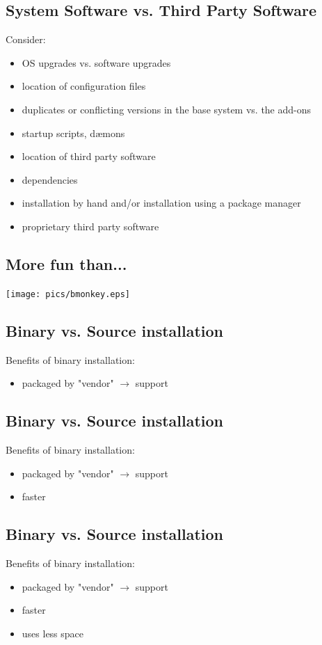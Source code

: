 \documentclass[xga]{xdvislides}
\begin{document}
\subsection{System Software vs. Third Party Software}
Consider:
\begin{itemize}
	\item OS upgrades vs. software upgrades
	\item location of configuration files
	\item duplicates or conflicting versions in the base system vs. the
		add-ons
	\item startup scripts, d{\ae}mons
	\item location of third party software
	\item dependencies
	\item installation by hand and/or installation using a package manager
	\item proprietary third party software
\end{itemize}

\subsection{More fun than...}
\vspace*{\fill}
\begin{center}
	\texttt{[image: pics/bmonkey.eps]}
\end{center}

\subsection{Binary vs. Source installation}
Benefits of binary installation:
\begin{itemize}
	\item packaged by "vendor" $\rightarrow$ support
\end{itemize}

\subsection{Binary vs. Source installation}
Benefits of binary installation:
\begin{itemize}
	\item packaged by "vendor" $\rightarrow$ support
	\item faster
\end{itemize}

\subsection{Binary vs. Source installation}
Benefits of binary installation:
\begin{itemize}
	\item packaged by "vendor" $\rightarrow$ support
	\item faster
	\item uses less space
\end{itemize}
\end{document}
